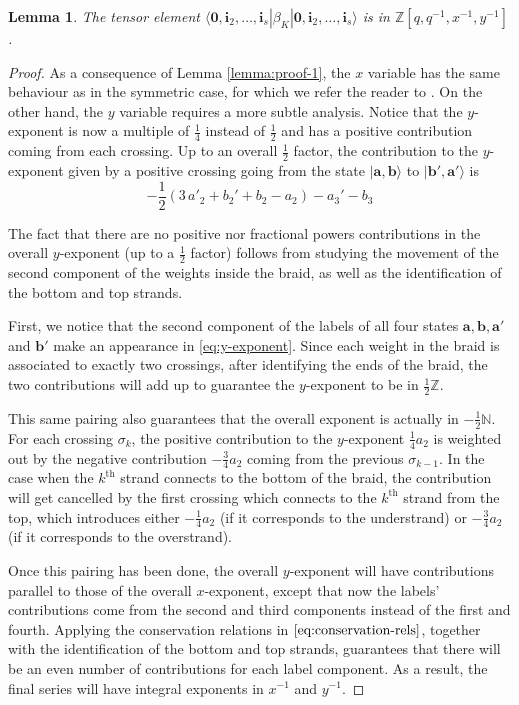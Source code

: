 \documentclass[12pt,oneside,reqno]{amsart}
\def\N{\mathbb{N}}
\def\Z{\mathbb{Z}}
\newtheorem{lema}{\bf Lemma}
\numberwithin{teorema}{section}
\numberwithin{definicion}{section}
\numberwithin{lema}{section}
\numberwithin{conjetura}{section}
\numberwithin{proposicion}{section}
\begin{document}
\begin{lema}\label{lemma:proof-2} The tensor element $\langle \textbf{0},\textbf{i}_2,\dots,\textbf{i}_s|\beta_K|\textbf{0},\textbf{i}_2,\dots,\textbf{i}_s\rangle$ is in $\mathbb{Z}[q,q^{-1},x^{-1},y^{-1}]$.
\end{lema}

\begin{proof}
As a consequence of Lemma \ref{lemma:proof-1}, the $x$ variable has the same behaviour as in the symmetric case, for which we refer the reader to \cite{gruen22}. On the other hand, the $y$ variable requires a more subtle analysis. Notice that the $y$-exponent is now a multiple of $\frac14$ instead of $\frac12$ and has a positive contribution coming from each crossing. Up to an overall $\frac{1}{2}$ factor, the contribution to the $y$-exponent given by a positive crossing going from the state $|\textbf{a},\textbf{b}\rangle$ to $|\textbf{b}',\textbf{a}'\rangle$ is 
\begin{equation}\label{eq:y-exponent}
    -\frac{1}{2}\left(3\,a'_2+b_2'+b_2-a_2\right)-a_3'-b_3
\end{equation}

The fact that there are no positive nor fractional powers contributions in the overall $y$-exponent (up to a $\frac12$ factor) follows from studying the movement of the second component of the weights inside the braid, as well as the identification of the bottom and top strands.

First, we notice that the second component of the labels of all four states $\textbf{a},\textbf{b},\textbf{a}'$ and $\textbf{b}'$ make an appearance in \eqref{eq:y-exponent}. Since each weight in the braid is associated to exactly two crossings, after identifying the ends of the braid, the two contributions will add up to guarantee the $y$-exponent to be in $\frac12\Z$.

This same pairing also guarantees that the overall exponent is actually in $-\frac12\N$. For each crossing $\sigma_k$, the positive contribution to the $y$-exponent $\frac{1}{4}a_2$ is weighted out by the negative contribution $-\frac{3}{4}a_2$ coming from the previous $\sigma_{k-1}$. In the case when the $k^\text{th}$ strand connects to the bottom of the braid, the contribution will get cancelled by the first crossing which connects to the $k^\text{th}$ strand from the top, which introduces either $-\frac{1}{4}a_2$ (if it corresponds to the understrand) or $-\frac34 a_2$ (if it corresponds to the overstrand).

Once this pairing has been done, the overall $y$-exponent will have contributions parallel to those of the overall $x$-exponent, except that now the labels' contributions come from the second and third components instead of the first and fourth. Applying the conservation relations in $\eqref{eq:conservation-rels}$, together with the identification of the bottom and top strands, guarantees that there will be an even number of contributions for each label component. As a result, the final series will have integral exponents in $x^{-1}$ and $y^{-1}$.
\end{proof}
\end{document}
